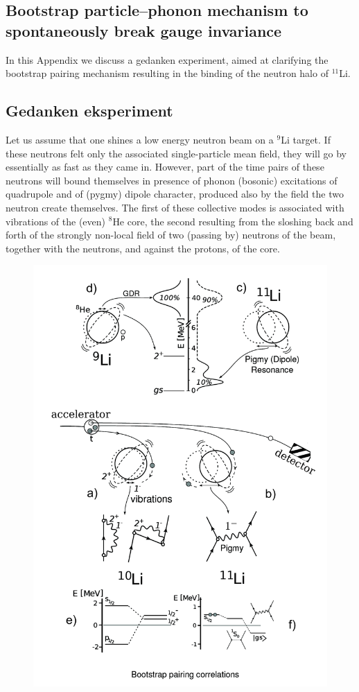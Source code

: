 \begin{subappendices}
\section[Bootstrap mechanism to break gauge invariance]{Bootstrap particle--phonon mechanism to spontaneously break gauge invariance}\label{C8AppA}
In this Appendix we discuss a gedanken experiment, aimed at clarifying the bootstrap pairing mechanism resulting in the binding of the neutron halo of $^{11}$Li. 
\subsection{Gedanken eksperiment}
Let us assume that one shines a  low energy neutron beam on a $^{9}$Li target. If these neutrons felt only the associated single-particle mean field, they will go by essentially as fast as they came in.  However,  part of the time pairs of these neutrons will bound themselves in  presence of phonon (bosonic) excitations of quadrupole and of (pygmy) dipole character, produced also by the field the two neutron create themselves. The first of these collective modes is  associated with vibrations of the (even) $^{8}$He core, the second resulting from the sloshing back and forth of the strongly non-local field of two (passing by) neutrons of the beam, together with the neutrons, and against the protons, of the core.
\begin{figure}[h!]
	\begin{center}
		\includegraphics[width=12cm]{C8/figsC8/BootStrap_Li}

\end{center}
\end{figure}
\end{subappendices}
